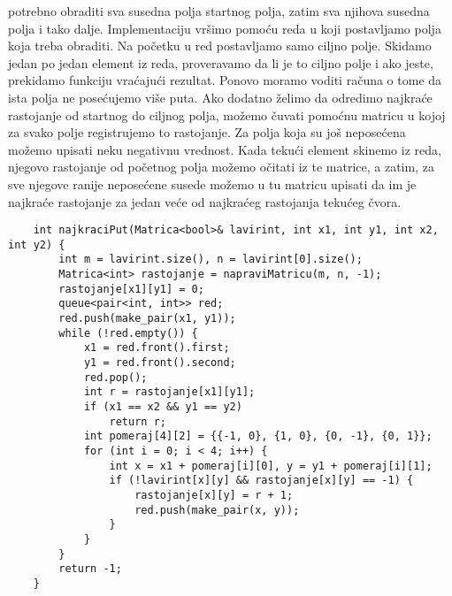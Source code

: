 \documentclass{article}
\begin{document}
potrebno obraditi sva susedna polja
startnog polja, zatim sva njihova susedna polja i tako dalje. Implementaciju
vršimo pomoću reda u koji postavljamo polja koja treba obraditi. Na početku
u red postavljamo samo ciljno polje. Skidamo jedan po jedan element iz reda,
proveravamo da li je to ciljno polje i ako jeste, prekidamo funkciju vraćajući
rezultat. Ponovo moramo voditi računa o tome da ista polja ne posećujemo više
puta. Ako dodatno želimo da odredimo najkraće rastojanje od startnog do ciljnog
polja, možemo čuvati pomoćnu matricu u kojoj za svako polje registrujemo to
rastojanje. Za polja koja su još neposećena možemo upisati neku negativnu
vrednost. Kada tekući element skinemo
iz reda, njegovo rastojanje od početnog polja možemo očitati iz te matrice, a
zatim, za sve njegove ranije neposećene susede možemo u tu matricu upisati da
im je najkraće rastojanje za jedan veće od najkraćeg rastojanja tekućeg čvora.
\begin{lstlisting}
    int najkraciPut(Matrica<bool>& lavirint, int x1, int y1, int x2, int y2) {
        int m = lavirint.size(), n = lavirint[0].size();
        Matrica<int> rastojanje = napraviMatricu(m, n, -1);
        rastojanje[x1][y1] = 0;
        queue<pair<int, int>> red;
        red.push(make_pair(x1, y1));
        while (!red.empty()) {
            x1 = red.front().first; 
            y1 = red.front().second;
            red.pop();
            int r = rastojanje[x1][y1];
            if (x1 == x2 && y1 == y2)
                return r;
            int pomeraj[4][2] = {{-1, 0}, {1, 0}, {0, -1}, {0, 1}};
            for (int i = 0; i < 4; i++) {
                int x = x1 + pomeraj[i][0], y = y1 + pomeraj[i][1];
                if (!lavirint[x][y] && rastojanje[x][y] == -1) {
                    rastojanje[x][y] = r + 1;
                    red.push(make_pair(x, y));
                }
            }
        }
        return -1;
    }
\end{lstlisting}
\end{document}
